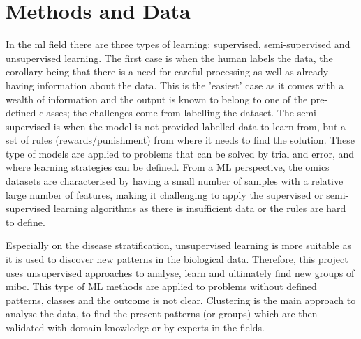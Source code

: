 \section{Methods and Data} \label{s:lit:computational}

\vspace{3mm}
\vspace{3mm}

In the \acrfull{ml} field there are three types of learning: supervised, semi-supervised and unsupervised learning. The first case is when the human labels the data, the corollary being that there is a need for careful processing as well as already having information about the data. This is the 'easiest' case as it comes with a wealth of information and the output is known to belong to one of the pre-defined classes; the challenges come from labelling the dataset. The semi-supervised is when the model is not provided labelled data to learn from, but a set of rules (rewards/punishment) from where it needs to find the solution. These type of models are applied to problems that can be solved by trial and error, and where learning strategies can be defined. From a ML perspective, the omics datasets are characterised by having a small number of samples with a relative large number of features, making it challenging to apply the supervised or semi-supervised learning algorithms as there is insufficient data or the rules are hard to define. 

Especially on the disease stratification, unsupervised learning is more suitable as it is used to discover new patterns in the biological data. Therefore, this project uses unsupervised approaches to analyse, learn and ultimately find new groups of \acrlong{mibc}. This type of ML methods are applied to problems without defined patterns, classes and the outcome is not clear. Clustering is the main approach to analyse the data, to find the present patterns (or groups) which  are then validated with domain knowledge or by experts in the fields. 

